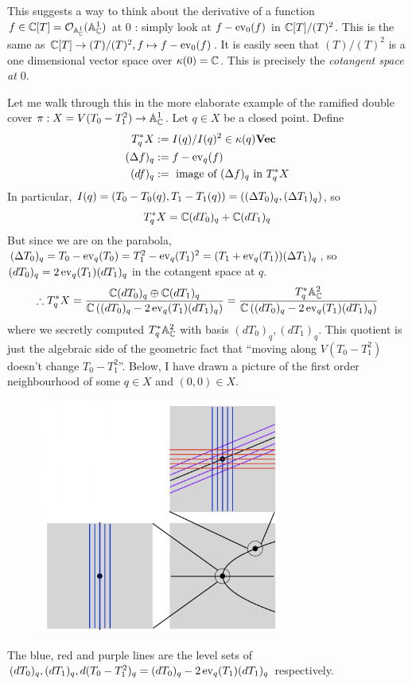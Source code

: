 \begin{eg}[Infinitesimals]
  This suggests a way to think about the derivative of a function 
  $f \in \mathbb{C}[T] = \mathcal{O}_{\mathbb{A}^1_{\mathbb{C}}}(\mathbb{A}^1_{\mathbb{C}})$ at $0$ : 
  simply look at $f - \operatorname{ev}_0(f)$ in $\mathbb{C}[T]/(T)^2$. 
  This is the same as 
  $\mathbb{C}[T] \to (T)/(T)^2, f \mapsto f - \operatorname{ev}_0(f)$.
  It is easily seen that $(T)/(T)^2$ is a one dimensional vector space over 
  $\kappa(0) = \mathbb{C}$.
  This is precisely the \textit{cotangent space at $0$}.

  Let me walk through this in the more elaborate example of 
  the ramified double cover $\pi : X = V(T_0 - T_1^2) \to \mathbb{A}^1_{\mathbb{C}}$.
  Let $q \in X$ be a closed point.
  Define 
  \begin{align*}
    T_q^* X &:= I(q)/I(q)^2 \in \kappa(q)\mathbf{Vec} \\
    (\Delta f)_q &:= f - \operatorname{ev}_q(f) \\
    (df)_q &:= \text{ image of $(\Delta f)_q$ in $T_q^* X$}
  \end{align*}
  In particular, $I(q) = (T_0 - T_0(q), T_1 - T_1(q))
  = ((\Delta T_0)_q, (\Delta T_1)_q)$, 
  so \[
    T_q^* X = \mathbb{C} (dT_0)_q + \mathbb{C} (dT_1)_q
  \]
  But since we are on the parabola, 
  $(\Delta T_0)_q = T_0 - \operatorname{ev}_q(T_0) 
  = T_1^2 - \operatorname{ev}_q(T_1)^2 = (T_1 + \operatorname{ev}_q(T_1)) (\Delta T_1)_q$,
  so $(dT_0)_q = 2 \operatorname{ev}_q(T_1) (dT_1)_q$ in the cotangent space at $q$.
  \[
    \therefore T_q^* X = \frac{\mathbb{C} (dT_0)_q \oplus \mathbb{C} (dT_1)_q}
    {\mathbb{C}\left((dT_0)_q - 2 \operatorname{ev}_q(T_1) (dT_1)_q\right)} 
    = \frac{T_q^* \mathbb{A}^2_{\mathbb{C}}}{\mathbb{C}\left((dT_0)_q - 2 \operatorname{ev}_q(T_1) (dT_1)_q\right)}
  \]
  where we secretly computed $T^*_q\mathbb{A}^2_{\mathbb{C}}$ with basis $(dT_0)_q, (dT_1)_q$.
  This quotient is just the algebraic side of the 
  geometric fact that 
  ``moving along $V(T_0 - T_1^2)$ doesn't change $T_0 - T_1^2$''.
  Below, I have drawn a picture of the first order neighbourhood of 
  some $q \in X$ and $(0,0) \in X$.
  \begin{figure}[H]
    \centering
    \includegraphics[width = 8cm]{cotangent.png}
  \end{figure}
  The blue, red and purple lines are the level sets of 
  $(dT_0)_q, (dT_1)_q, d(T_0 - T_1^2)_q = (dT_0)_q - 2\operatorname{ev}_q(T_1)(dT_1)_q$
  respectively. 


\end{eg}
